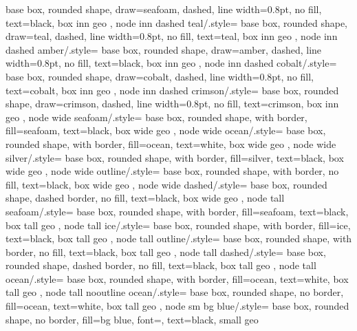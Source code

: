 {{		base box, rounded shape,
		draw=seafoam, dashed, line width=0.8pt,
		no fill, text=black, box inn geo
	},
	node inn dashed teal/.style={
		base box, rounded shape,
		draw=teal, dashed, line width=0.8pt,
		no fill, text=teal, box inn geo
	},
	node inn dashed amber/.style={
		base box, rounded shape,
		draw=amber, dashed, line width=0.8pt,
		no fill, text=black, box inn geo
	},
	node inn dashed cobalt/.style={
		base box, rounded shape,
		draw=cobalt, dashed, line width=0.8pt,
		no fill, text=cobalt, box inn geo
	},
	node inn dashed crimson/.style={
		base box, rounded shape,
		draw=crimson, dashed, line width=0.8pt,
		no fill, text=crimson, box inn geo
	},
	node wide seafoam/.style={
		base box, rounded shape, with border,
		fill=seafoam, text=black, box wide geo
	},
	node wide ocean/.style={
		base box, rounded shape, with border,
		fill=ocean, text=white, box wide geo
	},
	node wide silver/.style={
		base box, rounded shape, with border,
		fill=silver, text=black, box wide geo
	},
	node wide outline/.style={
		base box, rounded shape, with border,
		no fill, text=black, box wide geo
	},
	node wide dashed/.style={
		base box, rounded shape, dashed border,
		no fill, text=black, box wide geo
	},
	node tall seafoam/.style={
		base box, rounded shape, with border,
		fill=seafoam, text=black, box tall geo
	},
	node tall ice/.style={
		base box, rounded shape, with border,
		fill=ice, text=black, box tall geo
	},
	node tall outline/.style={
		base box, rounded shape, with border,
		no fill, text=black, box tall geo
	},
	node tall dashed/.style={
		base box, rounded shape, dashed border,
		no fill, text=black, box tall geo
	},
	node tall ocean/.style={
		base box, rounded shape, with border,
		fill=ocean, text=white, box tall geo
	},
	node tall nooutline ocean/.style={
		base box, rounded shape, no border,
		fill=ocean, text=white, box tall geo
	},
	node sm bg blue/.style={
		base box, rounded shape, no border,
		fill=bg blue, font=\small\sffamily,
		text=black, small geo
}}
